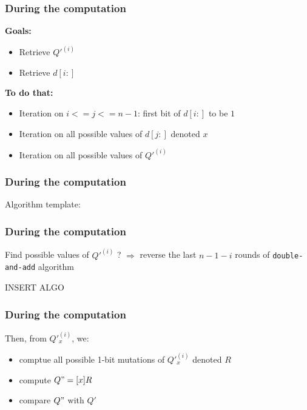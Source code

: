 \documentclass{beamer}
\begin{document}
    \begin{frame}
        \frametitle{During the computation}
       
        {\bf Goals:}
        \begin{itemize}
            \item \color{black} { Retrieve $Q'^{(i)}$}
            \item \color{black} { Retrieve $d[i:]$ }
        \end{itemize}

        {\bf To do that:}
        \begin{itemize}
            \item \color{black} { Iteration on  $i <= j <= n-1$: first bit of $d[i:]$ to be $1$}
            \item \color{black} { Iteration on all possible values of $d[j:]$ denoted $x$}
            \item \color{black} { Iteration on all possible values of $Q'^{(i)}$}
        \end{itemize}
    \end{frame}
    
    \begin{frame}
        \frametitle{During the computation}
        Algorithm template:

    \end{frame}

    \begin{frame}
        \frametitle{During the computation}
        Find possible values of $Q'^{(i)}$ ? $\Rightarrow$ reverse the last $n-1-i$ rounds of {\tt double-and-add} algorithm
        \begin{center}
        INSERT ALGO %
        \end{center}
    \end{frame}

    \begin{frame}
        \frametitle{During the computation}
        Then, from $Q'_x^{(i)}$, we:
        \begin{itemize}
            \item \color{black} { comptue all possible 1-bit mutations of $Q'_x^(i)$ denoted $R$ }
            \item \color{black} { compute $Q" = [x]R$}
            \item \color{black} { compare $Q"$ with $Q'$}
        \end{itemize}
    \end{frame}
\end{document}
